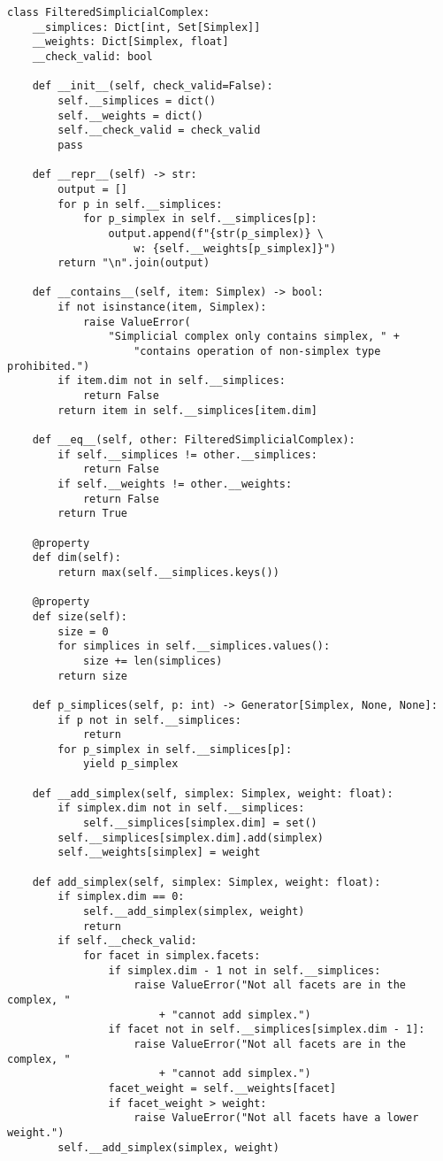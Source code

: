\begin{verbatim}
class FilteredSimplicialComplex:
    __simplices: Dict[int, Set[Simplex]]
    __weights: Dict[Simplex, float]
    __check_valid: bool

    def __init__(self, check_valid=False):
        self.__simplices = dict()
        self.__weights = dict()
        self.__check_valid = check_valid
        pass

    def __repr__(self) -> str:
        output = []
        for p in self.__simplices:
            for p_simplex in self.__simplices[p]:
                output.append(f"{str(p_simplex)} \
                    w: {self.__weights[p_simplex]}")
        return "\n".join(output)

    def __contains__(self, item: Simplex) -> bool:
        if not isinstance(item, Simplex):
            raise ValueError(
                "Simplicial complex only contains simplex, " +
                    "contains operation of non-simplex type prohibited.")
        if item.dim not in self.__simplices:
            return False
        return item in self.__simplices[item.dim]

    def __eq__(self, other: FilteredSimplicialComplex):
        if self.__simplices != other.__simplices:
            return False
        if self.__weights != other.__weights:
            return False
        return True

    @property
    def dim(self):
        return max(self.__simplices.keys())

    @property
    def size(self):
        size = 0
        for simplices in self.__simplices.values():
            size += len(simplices)
        return size

    def p_simplices(self, p: int) -> Generator[Simplex, None, None]:
        if p not in self.__simplices:
            return
        for p_simplex in self.__simplices[p]:
            yield p_simplex

    def __add_simplex(self, simplex: Simplex, weight: float):
        if simplex.dim not in self.__simplices:
            self.__simplices[simplex.dim] = set()
        self.__simplices[simplex.dim].add(simplex)
        self.__weights[simplex] = weight

    def add_simplex(self, simplex: Simplex, weight: float):
        if simplex.dim == 0:
            self.__add_simplex(simplex, weight)
            return
        if self.__check_valid:
            for facet in simplex.facets:
                if simplex.dim - 1 not in self.__simplices:
                    raise ValueError("Not all facets are in the complex, " 
                        + "cannot add simplex.")
                if facet not in self.__simplices[simplex.dim - 1]:
                    raise ValueError("Not all facets are in the complex, " 
                        + "cannot add simplex.")
                facet_weight = self.__weights[facet]
                if facet_weight > weight:
                    raise ValueError("Not all facets have a lower weight.")
        self.__add_simplex(simplex, weight)


\end{verbatim}
